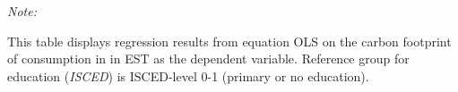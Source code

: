 \begin{table}[htbp!]
\begin{adjustbox}{width = 1\textwidth, max height = 0.95\textheight, center}
\begin{threeparttable}[b]
         \begin{tablenotes}\item \medskip \textit{Note:}
            \item This table displays regression results from equation OLS on the carbon footprint of consumption in  in EST as the dependent variable.  Reference group for education (\textit{ISCED}) is ISCED-level 0-1 (primary or no education).
         \end{tablenotes}
      \end{threeparttable}
   \end{adjustbox}
\end{table}


